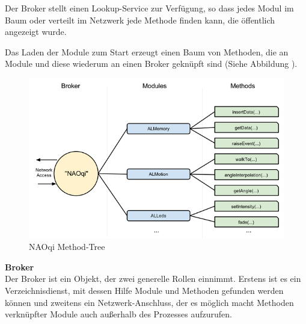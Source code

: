 Der Broker stellt einen Lookup-Service zur Verfügung, so dass jedes Modul im Baum oder verteilt im Netzwerk jede Methode finden kann, die öffentlich angezeigt wurde.

Das Laden der Module zum Start erzeugt einen Baum von Methoden, die an Module und diese wiederum an einen Broker geknüpft sind (Siehe Abbildung ).

\begin{figure}[H]						
	\centering							
	\includegraphics[scale=0.8]{Bilder/naoqi_process2.PNG}
	\caption{NAOqi Method-Tree}						
	\label{f:naoqi_broker2}						
\end{figure}
\noindent
\textbf{Broker}
\\
Der Broker ist ein Objekt, der zwei generelle Rollen einnimmt. Erstens ist es ein Verzeichnisdienst, mit dessen Hilfe Module und Methoden gefunden werden können und zweitens ein Netzwerk-Anschluss, der es möglich macht Methoden verknüpfter Module auch außerhalb des Prozesses aufzurufen.

